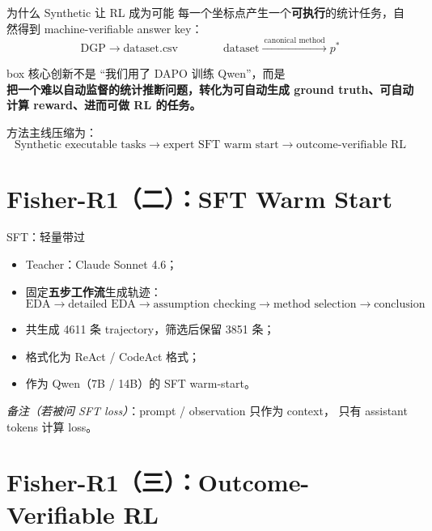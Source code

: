 \documentclass[aspectratio=169]{ctexbeamer}
\begin{document}
\begin{frame}{为什么 Synthetic 让 RL 成为可能}
  每一个坐标点产生一个\textbf{可执行}的统计任务，自然得到
  machine-verifiable answer key：
  \[
    \text{DGP} \rightarrow \text{dataset.csv}
    \qquad\qquad
    \text{dataset} \xrightarrow{\ \text{canonical method}\ } p^{*}
  \]

  \medskip
  \begin{beamercolorbox}[center, sep=8pt]{box}
    核心创新不是 ``我们用了 DAPO 训练 Qwen''，而是\\
    \textbf{把一个难以自动监督的统计推断问题，转化为可自动生成
    ground truth、可自动计算 reward、进而可做 RL 的任务。}
  \end{beamercolorbox}

  \medskip
  方法主线压缩为：
  \[
    \text{Synthetic executable tasks}
    \rightarrow \text{expert SFT warm start}
    \rightarrow \text{outcome-verifiable RL}
  \]
\end{frame}

\section{Fisher-R1（二）：SFT Warm Start}

\begin{frame}{SFT：轻量带过}
  \begin{itemize}
    \item Teacher：Claude Sonnet 4.6；
    \item 固定\textbf{五步工作流}生成轨迹：
      \[
        \text{EDA} \rightarrow \text{detailed EDA}
        \rightarrow \text{assumption checking}
        \rightarrow \text{method selection}
        \rightarrow \text{conclusion}
      \]
    \item 共生成 4611 条 trajectory，筛选后保留 3851 条；
    \item 格式化为 ReAct / CodeAct 格式；
    \item 作为 Qwen（7B / 14B）的 SFT warm-start。
  \end{itemize}

  \medskip
  \textit{备注（若被问 SFT loss）}：prompt / observation 只作为 context，
  只有 assistant tokens 计算 loss。
\end{frame}

\section{Fisher-R1（三）：Outcome-Verifiable RL}
\end{document}
